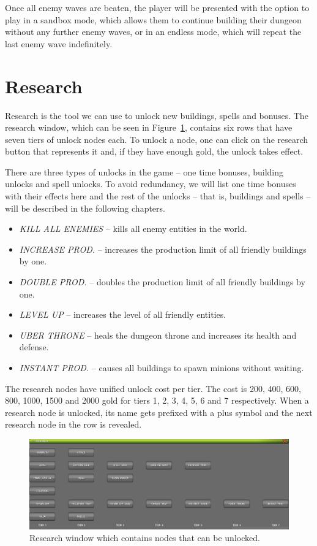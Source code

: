 Once all enemy waves are beaten, the player will be presented with the option to play in a sandbox mode, which allows them to continue
building their dungeon without any further enemy waves, or in an endless mode, which will repeat the last enemy wave indefinitely.

\section{Research}

Research is the tool we can use to unlock new buildings, spells and bonuses. The research window, which can be seen in
Figure~\ref{gui-research}, contains six rows that have seven tiers of unlock nodes each. To unlock a node, one can click on the research
button that represents it and, if they have enough gold, the unlock takes effect.

There are three types of unlocks in the game -- one time bonuses, building unlocks and spell unlocks. To avoid redundancy, we will
list one time bonuses with their effects here and the rest of the unlocks -- that is, buildings and spells -- will be described in the
following chapters.

\begin{itemize}
    \item \emph{KILL ALL ENEMIES} -- kills all enemy entities in the world.
    \item \emph{INCREASE PROD.} -- increases the production limit of all friendly buildings by one.
    \item \emph{DOUBLE PROD.} -- doubles the production limit of all friendly buildings by one.
    \item \emph{LEVEL UP} -- increases the level of all friendly entities.
    \item \emph{UBER THRONE} -- heals the dungeon throne and increases its health and defense.
    \item \emph{INSTANT PROD.} -- causes all buildings to spawn minions without waiting.
\end{itemize}

The research nodes have unified unlock cost per tier. The cost is 200, 400, 600, 800, 1000, 1500 and 2000 gold for tiers 1, 2, 3, 4, 5, 6 and
7 respectively. When a research node is unlocked, its name gets prefixed with a plus symbol and the next research node in the row is revealed.

\begin{figure}[H]
    \centering
    \includegraphics[width=\textwidth]{../img/gui-research.png}
    \caption{Research window which contains nodes that can be unlocked.}
    \label{gui-research}
\end{figure}

